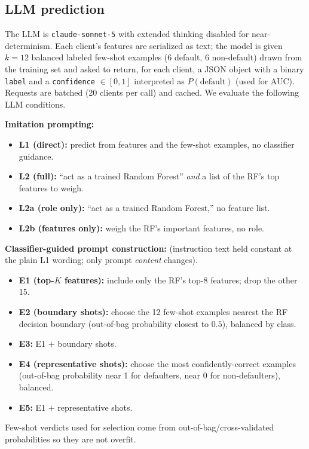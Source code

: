 \documentclass[conference]{IEEEtran}
\begin{document}
\subsection{LLM prediction}
The LLM is \texttt{claude-sonnet-5} with extended thinking disabled for near-determinism. Each client's features are serialized as text; the model is given $k{=}12$ balanced labeled few-shot examples (6 default, 6 non-default) drawn from the training set and asked to return, for each client, a JSON object with a binary \texttt{label} and a \texttt{confidence} $\in[0,1]$ interpreted as $P(\text{default})$ (used for AUC). Requests are batched (20 clients per call) and cached. We evaluate the following LLM conditions.

\textbf{Imitation prompting:}
\begin{itemize}
    \item \textbf{L1 (direct):} predict from features and the few-shot examples, no classifier guidance.
    \item \textbf{L2 (full):} ``act as a trained Random Forest'' \emph{and} a list of the RF's top features to weigh.
    \item \textbf{L2a (role only):} ``act as a trained Random Forest,'' no feature list.
    \item \textbf{L2b (features only):} weigh the RF's important features, no role.
\end{itemize}

\textbf{Classifier-guided prompt construction:} (instruction text held constant at the plain L1 wording; only prompt \emph{content} changes).
\begin{itemize}
    \item \textbf{E1 (top-$K$ features):} include only the RF's top-8 features; drop the other 15.
    \item \textbf{E2 (boundary shots):} choose the 12 few-shot examples nearest the RF decision boundary (out-of-bag probability closest to $0.5$), balanced by class.
    \item \textbf{E3:} E1 $+$ boundary shots.
    \item \textbf{E4 (representative shots):} choose the most confidently-correct examples (out-of-bag probability near 1 for defaulters, near 0 for non-defaulters), balanced.
    \item \textbf{E5:} E1 $+$ representative shots.
\end{itemize}
Few-shot verdicts used for selection come from out-of-bag/cross-validated probabilities so they are not overfit.
\end{document}
